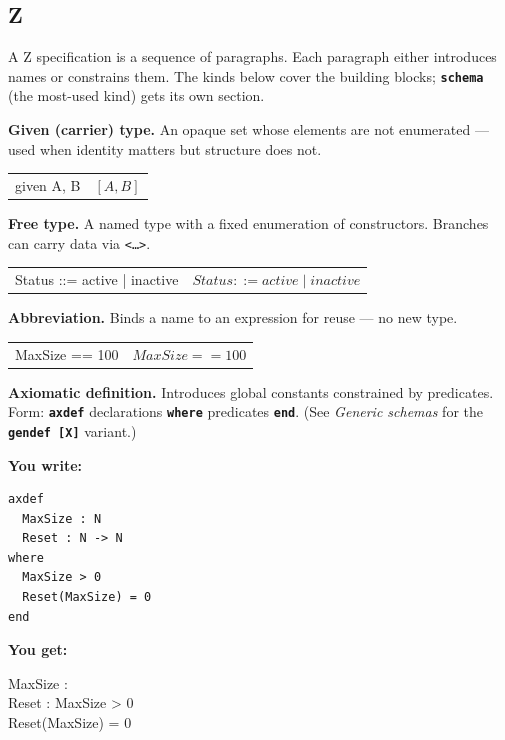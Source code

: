 \documentclass[10pt,landscape,a4paper]{article}
\newcommand{\kw}[1]{\texttt{\bfseries #1}}
\newenvironment{exwrite}%
  {\par\nobreak\noindent\scriptsize\textbf{You write:}\par\nobreak\vspace{0pt}\scriptsize}%
  {\vspace{1pt}\nobreak}
\newenvironment{exget}%
  {\par\nobreak\noindent\scriptsize\textbf{You get:}\par\nobreak\vspace{0pt}\small}%
  {\par\vspace{3pt}}
\begin{document}
\begin{multicols}{2}
\raggedcolumns

\section{Z}

{\scriptsize A Z specification is a sequence of paragraphs.  Each paragraph either introduces names or constrains them.  The kinds below cover the building blocks; \kw{schema} (the most-used kind) gets its own section.}

\smallskip
{}
\textbf{Given (carrier) type.} An opaque set whose elements are not enumerated --- used when identity matters but structure does not.

\begin{tabularx}{\columnwidth}{LR}
given A, B           & $[A, B]$ \\
\end{tabularx}

\smallskip
{}
\textbf{Free type.} A named type with a fixed enumeration of constructors.  Branches can carry data via \texttt{<\ldots>}.

\begin{tabularx}{\columnwidth}{LR}
Status ::= active | inactive  & $Status ::= active \mid inactive$ \\
\end{tabularx}

\smallskip
{}
\textbf{Abbreviation.} Binds a name to an expression for reuse --- no new type.

\begin{tabularx}{\columnwidth}{LR}
MaxSize == 100              & $MaxSize == 100$ \\
\end{tabularx}

\smallskip
{}
\textbf{Axiomatic definition.} Introduces global constants constrained by predicates.  Form: \kw{axdef} declarations \kw{where} predicates \kw{end}.  (See \textit{Generic schemas} for the \kw{gendef [X]} variant.)

\begin{exwrite}%
\begin{verbatim}
axdef
  MaxSize : N
  Reset : N -> N
where
  MaxSize > 0
  Reset(MaxSize) = 0
end
\end{verbatim}
\end{exwrite}
\begin{exget}%
\begin{axdef}
MaxSize : \nat \\
Reset : \nat \fun \nat
\where
MaxSize > 0 \\
Reset(MaxSize) = 0
\end{axdef}
\end{exget}


\end{multicols}
\end{document}
